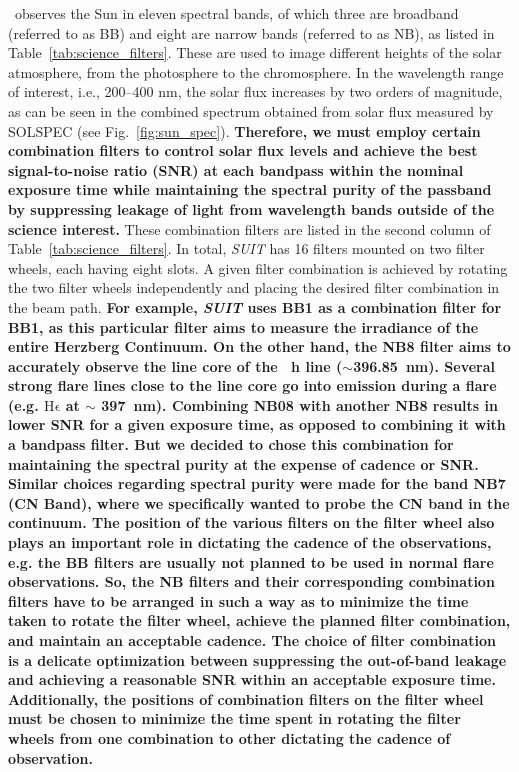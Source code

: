 \suit~observes the Sun in eleven spectral bands, of which three are broadband (referred to as BB) and eight are narrow bands (referred to as NB), as listed in Table~\ref{tab:science_filters}. These are used to image different heights of the solar atmosphere, from the photosphere to the chromosphere. In the wavelength range of interest, i.e., 200{--}400 nm, the solar flux increases by two orders of magnitude, as can be seen in the combined spectrum obtained from solar flux measured by SOLSPEC (see Fig.~\ref{fig:sun_spec}). {\bf Therefore, we must employ certain combination filters to control solar flux levels and achieve the best signal-to-noise ratio (SNR) at each bandpass within the nominal exposure time while maintaining the spectral purity of the passband by suppressing leakage of light from wavelength bands outside of the science interest.} These combination filters are listed in the second column of Table~\ref{tab:science_filters}. In total, \textit{SUIT} has 16 filters mounted on two filter wheels, each having eight slots. A given filter combination is achieved by rotating the two filter wheels independently and placing the desired filter combination in the beam path. {\bf For example, \textit{SUIT} uses BB1 as a combination filter for BB1, as this particular filter aims to measure the irradiance of the entire Herzberg Continuum. On the other hand, the NB8 filter aims to accurately observe the line core of the ~h line ($\sim$396.85~nm). Several strong flare lines close to the line core go into emission during a flare (e.g. $\mathrm{H\epsilon}$ at $\sim$ 397~nm). Combining NB08 with another NB8 results in lower SNR for a given exposure time, as opposed to combining it with a bandpass filter. But we decided to chose this combination for maintaining the spectral purity at the expense of cadence or SNR. Similar choices regarding spectral purity were made for the band NB7 (CN Band), where we specifically wanted to probe the CN band in the continuum. The position of the various filters on the filter wheel also plays an important role in dictating the cadence of the observations, e.g. the BB filters are usually not planned to be used in normal flare observations. So, the NB filters and their corresponding combination filters have to be arranged in such a way as to minimize the time taken to rotate the filter wheel, achieve the planned filter combination, and maintain an acceptable cadence. The choice of filter combination is a delicate optimization between suppressing the out-of-band leakage and achieving a reasonable SNR within an acceptable exposure time. Additionally, the positions of combination filters on the filter wheel must be chosen to minimize the time spent in rotating the filter wheels from one combination to other dictating the cadence of observation.}


